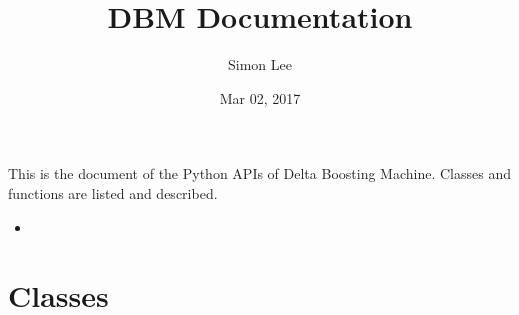 \documentclass[letterpaper,10pt,english]{sphinxmanual}
\title{DBM Documentation}
\date{Mar 02, 2017}
\author{Simon Lee}
\begin{document}
\maketitle
\sphinxtableofcontents
{}\label{\detokenize{index::doc}}


This is the document of the Python APIs of Delta Boosting Machine. Classes and functions are listed and described.
\begin{itemize}
\item {} 

\end{itemize}


\chapter{Classes}
\label{\detokenize{index:welcome-to-dbm-s-documentation}}\label{\detokenize{index:classes}}
\end{document}
